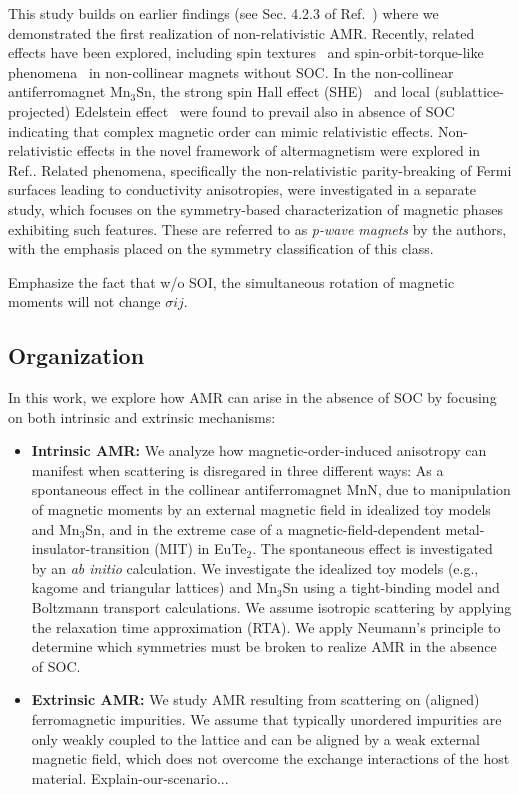 \documentclass[prb,showpacs,amsmath,amssymb,superscriptaddress,twocolumn,floatfix]{revtex4-1}
\begin{document}
This study builds on earlier findings (see Sec. 4.2.3 of Ref.~\cite{Ritzinger:2023}) where we demonstrated the first realization of non-relativistic AMR. Recently, related effects have been explored, including spin textures~\cite{Bonbien:2022} and spin-orbit-torque-like phenomena~\cite{Gonzalez-Hernandez:2024} in non-collinear magnets without SOC. In the non-collinear antiferromagnet Mn$_3$Sn, the strong spin Hall effect (SHE)~\cite{Zhou:2020, Zhang:2017} and local (sublattice-projected) Edelstein effect~\cite{Gonzalez-Hernandez:2024} were found to prevail also in absence of SOC~\cite{Manna:2018, Gonzalez-Hernandez:2024} indicating that complex magnetic order can mimic relativistic effects. Non-relativistic effects in the novel framework of altermagnetism were explored in Ref.\cite{Jungwirth:2024}. Related phenomena, specifically the non-relativistic parity-breaking of Fermi surfaces leading to conductivity anisotropies, were investigated in a separate study\cite{BirkHellens:2023}, which focuses on the symmetry-based characterization of magnetic phases exhibiting such features. These are referred to as \textit{p-wave magnets} by the authors, with the emphasis placed on the symmetry classification of this class.

{\color{red} Emphasize the fact that w/o SOI, the simultaneous
  rotation of magnetic moments will not change $\sigma{ij}$.}

\subsection{Organization}

In this work, we explore how AMR can arise in the absence of SOC by focusing on both intrinsic and extrinsic mechanisms: 


\begin{itemize}
	\item \textbf{Intrinsic AMR:} We analyze how magnetic-order-induced anisotropy can manifest when scattering is disregared in three different ways: As a spontaneous effect in the collinear antiferromagnet MnN, due to manipulation of magnetic moments by an external magnetic field in idealized toy models and Mn$_3$Sn, and in the extreme case of a magnetic-field-dependent metal-insulator-transition (MIT) in EuTe$_2$. The spontaneous effect is investigated by an \textit{ab initio} calculation. We investigate the idealized toy models (e.g., kagome and triangular lattices) and Mn$_3$Sn using a tight-binding model and Boltzmann transport calculations. We assume isotropic scattering by applying the relaxation time approximation (RTA). We apply Neumann’s principle to determine which symmetries must be broken to realize AMR in the absence of SOC.
	
	\item \textbf{Extrinsic AMR:} We study AMR resulting from scattering on (aligned) ferromagnetic impurities. We assume that typically unordered impurities are only weakly coupled to the lattice and can be aligned by a weak external magnetic field, which does not overcome the exchange interactions of the host material.	{\color{red}Explain-our-scenario...}
\end{itemize}
 
\end{document}
